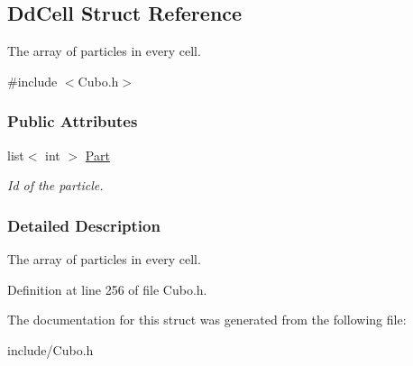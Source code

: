 \hypertarget{structDdCell}{}\subsection{Dd\+Cell Struct Reference}
\label{structDdCell}


The array of particles in every cell.  




{\ttfamily \#include $<$Cubo.\+h$>$}

\subsubsection*{Public Attributes}
\begin{DoxyCompactItemize}
\item 
list$<$ int $>$ \hyperlink{structDdCell_a42047980ffca3c08f6cce82c43c71373}{Part}\hypertarget{structDdCell_a42047980ffca3c08f6cce82c43c71373}{}\label{structDdCell_a42047980ffca3c08f6cce82c43c71373}

\begin{DoxyCompactList}\small\item\em Id of the particle. \end{DoxyCompactList}\end{DoxyCompactItemize}


\subsubsection{Detailed Description}
The array of particles in every cell. 

Definition at line 256 of file Cubo.\+h.



The documentation for this struct was generated from the following file\+:\begin{DoxyCompactItemize}
\item 
include/Cubo.\+h\end{DoxyCompactItemize}

